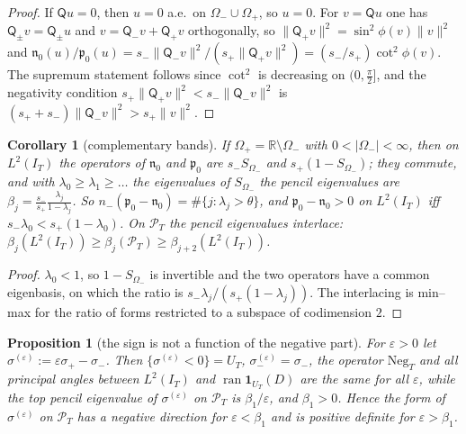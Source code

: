 \documentclass[11pt]{amsart}
\newtheorem{proposition}[theorem]{Proposition}
\newtheorem{corollary}[theorem]{Corollary}
\theoremstyle{definition}
\theoremstyle{remark}
\newcommand{\R}{\mathbb R}
\newcommand{\PT}{\mathcal P_T}
\newcommand{\IT}{I_T}
\begin{document}
\begin{proof}
If $\mathsf Qu=0$, then $\widehat u=0$ a.e.\ on $\Omega_-\cup\Omega_+$, so $u=0$. For $v=\mathsf Qu$ one has
$\mathsf Q_\pm v=\mathsf Q_\pm u$ and $v=\mathsf Q_-v+\mathsf Q_+v$ orthogonally, so $\|\mathsf Q_+v\|^2=\sin^2\phi(v)\|v\|^2$ and
$\mathfrak n_0(u)/\mathfrak p_0(u)=s_-\|\mathsf Q_-v\|^2/(s_+\|\mathsf Q_+v\|^2)=(s_-/s_+)\cot^2\phi(v)$. The supremum statement
follows since $\cot^2$ is decreasing on $(0,\frac\pi2]$, and the negativity condition
$s_+\|\mathsf Q_+v\|^2<s_-\|\mathsf Q_-v\|^2$ is $(s_++s_-)\|\mathsf Q_-v\|^2>s_+\|v\|^2$.
\end{proof}

\begin{corollary}[complementary bands]\label{cor:wh-nogap}
If $\Omega_+=\R\setminus\Omega_-$ with $0<|\Omega_-|<\infty$, then on $L^2(\IT)$ the operators of $\mathfrak n_0$ and
$\mathfrak p_0$ are $s_-S_{\Omega_-}$ and $s_+(1-S_{\Omega_-})$; they commute, and with $\lambda_0\ge\lambda_1\ge\dots$ the
eigenvalues of $S_{\Omega_-}$ the pencil eigenvalues are $\beta_j=\frac{s_-}{s_+}\frac{\lambda_j}{1-\lambda_j}$. So
$n_-(\mathfrak p_0-\mathfrak n_0)=\#\{j:\lambda_j>\theta\}$, and $\mathfrak p_0-\mathfrak n_0>0$ on $L^2(\IT)$ iff
$s_-\lambda_0<s_+(1-\lambda_0)$. On $\PT$ the pencil eigenvalues interlace:
$\beta_j(L^2(\IT))\ge\beta_j(\PT)\ge\beta_{j+2}(L^2(\IT))$.
\end{corollary}

\begin{proof}
$\lambda_0<1$, so $1-S_{\Omega_-}$ is invertible and the two operators have a common eigenbasis, on which the
ratio is $s_-\lambda_j/(s_+(1-\lambda_j))$. The interlacing is min--max for the ratio of forms restricted to a
subspace of codimension $2$.
\end{proof}

\begin{proposition}[the sign is not a function of the negative part]\label{prop:wh-notangles}
For $\varepsilon>0$ let $\sigma^{(\varepsilon)}:=\varepsilon\sigma_+-\sigma_-$. Then $\{\sigma^{(\varepsilon)}<0\}=U_T$,
$\sigma^{(\varepsilon)}_-=\sigma_-$, the operator $\mathrm{Neg}_T$ and all principal angles between $L^2(\IT)$ and
$\operatorname{ran}\mathbf 1_{U_T}(D)$ are the same for all $\varepsilon$, while the top pencil eigenvalue of
$\sigma^{(\varepsilon)}$ on $\PT$ is $\beta_1/\varepsilon$, and $\beta_1>0$. Hence the form of $\sigma^{(\varepsilon)}$ on
$\PT$ has a negative direction for $\varepsilon<\beta_1$ and is positive definite for $\varepsilon>\beta_1$.
\end{proposition}
\end{document}
